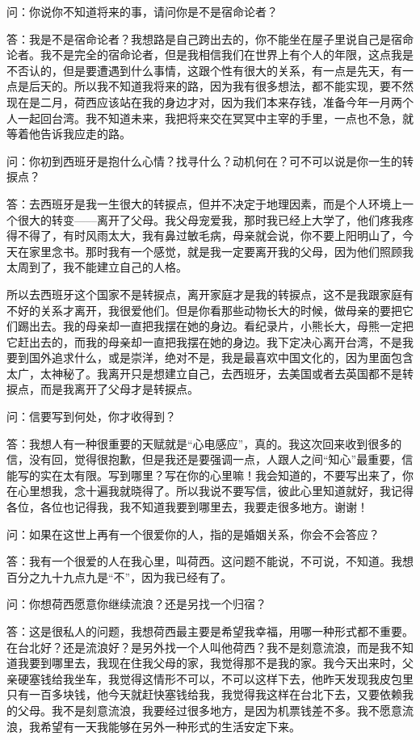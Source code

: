 \par 问：你说你不知道将来的事，请问你是不是宿命论者？
\par 答：我是不是宿命论者？我想路是自己跨出去的，你不能坐在屋子里说自己是宿命论者。我不是完全的宿命论者，但是我相信我们在世界上有个人的年限，这点我是不否认的，但是要遭遇到什么事情，这跟个性有很大的关系，有一点是先天，有一点是后天的。所以我不知道我将来的路，因为我有很多想法，都不能实现，要不然现在是二月，荷西应该站在我的身边才对，因为我们本来存钱，准备今年一月两个人一起回台湾。我不知道未来，我把将来交在冥冥中主宰的手里，一点也不急，就等着他告诉我应走的路。
\par 问：你初到西班牙是抱什么心情？找寻什么？动机何在？可不可以说是你一生的转捩点？
\par 答：去西班牙是我一生很大的转捩点，但并不决定于地理因素，而是个人环境上一个很大的转变——离开了父母。我父母宠爱我，那时我已经上大学了，他们疼我疼得不得了，有时风雨太大，我有鼻过敏毛病，母亲就会说，你不要上阳明山了，今天在家里念书。那时我有一个感觉，就是我一定要离开我的父母，因为他们照顾我太周到了，我不能建立自己的人格。
\par 所以去西班牙这个国家不是转捩点，离开家庭才是我的转捩点，这不是我跟家庭有不好的关系才离开，我很爱他们。但是你看那些动物长大的时候，做母亲的要把它们踢出去。我的母亲却一直把我摆在她的身边。看纪录片，小熊长大，母熊一定把它赶出去的，而我的母亲却一直把我摆在她的身边。我下定决心离开台湾，不是我要到国外追求什么，或是崇洋，绝对不是，我是最喜欢中国文化的，因为里面包含太广，太神秘了。我离开只是想建立自己，去西班牙，去美国或者去英国都不是转捩点，而是我离开了父母才是转捩点。
\par 问：信要写到何处，你才收得到？
\par 答：我想人有一种很重要的天赋就是“心电感应”，真的。我这次回来收到很多的信，没有回，觉得很抱歉，但是我还是要强调一点，人跟人之间“知心”最重要，信能写的实在太有限。写到哪里？写在你的心里嘛！我会知道的，不要写出来了，你在心里想我，念十遍我就晓得了。所以我说不要写信，彼此心里知道就好，我记得各位，各位也记得我，我不知道我要到哪里去，我要走很多地方。谢谢！
\par 问：如果在这世上再有一个很爱你的人，指的是婚姻关系，你会不会答应？
\par 答：我有一个很爱的人在我心里，叫荷西。这问题不能说，不可说，不知道。我想百分之九十九点九是“不”，因为我已经有了。
\par 问：你想荷西愿意你继续流浪？还是另找一个归宿？
\par 答：这是很私人的问题，我想荷西最主要是希望我幸福，用哪一种形式都不重要。在台北好？还是流浪好？是另外找一个人叫他荷西？我不是刻意流浪，而是我不知道我要到哪里去，我现在住我父母的家，我觉得那不是我的家。我今天出来时，父亲硬塞钱给我坐车，我觉得这情形不可以，不可以这样下去，他昨天发现我皮包里只有一百多块钱，他今天就赶快塞钱给我，我觉得我这样在台北下去，又要依赖我的父母。我不是刻意流浪，我要经过很多地方，是因为机票钱差不多。我不愿意流浪，我希望有一天我能够在另外一种形式的生活安定下来。
